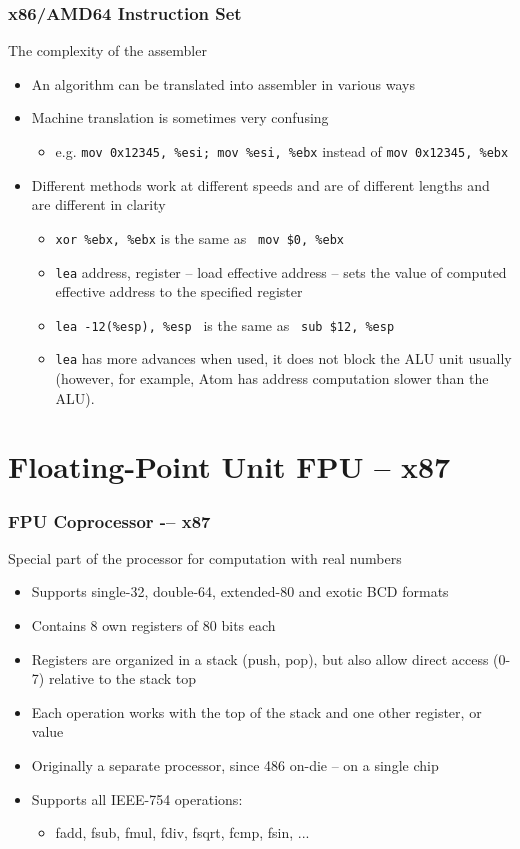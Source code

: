 \documentclass{beamer}
\begin{document}
\begin{frame}
\frametitle{x86/AMD64 Instruction Set}
The complexity of the assembler
\begin{itemize}
\item An algorithm can be translated into assembler in various ways
\item Machine translation is sometimes very confusing
\begin{itemize}
\item e.g. \texttt{mov 0x12345, \%esi; mov \%esi, \%ebx} instead of \texttt{mov 0x12345, \%ebx}
\end{itemize}
\item Different methods work at different speeds and are of different lengths and are different in clarity
\begin{itemize}
\item \texttt{xor \%ebx, \%ebx} is the same as \texttt{ mov \$0, \%ebx}
\item \texttt{lea} address, register – load effective address – sets the value of computed effective address to the specified register
\item \texttt{lea -12(\%esp), \%esp } is the same as \texttt{ sub \$12, \%esp}
\item \texttt{lea} has more advances when used, it does not block the ALU unit usually (however, for example, Atom has address computation slower than the ALU).
\end{itemize}
\end{itemize}
\end{frame}

\section{Floating-Point Unit FPU -- x87}


\begin{frame}
\frametitle{FPU Coprocessor -– x87}
Special part of the processor for computation with real numbers
\begin{itemize}
\item Supports single-32, double-64, extended-80 and exotic BCD formats
\item Contains 8 own registers of 80 bits each
\item Registers are organized in a stack (push, pop), but also allow direct access (0-7) relative to the stack top
\item Each operation works with the top of the stack and one other register, or value
\item Originally a separate processor, since 486 on-die -- on a single chip
\item Supports all IEEE-754 operations:
\begin{itemize}
\item fadd, fsub, fmul, fdiv, fsqrt, fcmp, fsin, ...
\end{itemize}
\end{itemize}
\end{frame}
\end{document}
